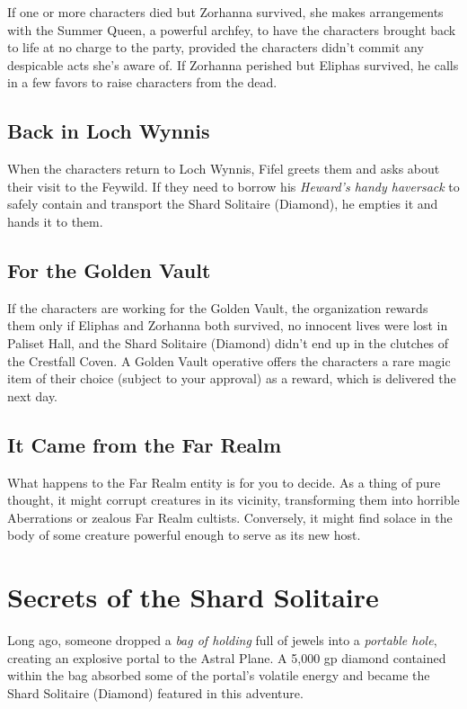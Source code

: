 \documentclass[10pt,a4paper,twoside,bg=print,twocolumn,openany,nodeprecatedcode]{dndbook}
\begin{document}
If one or more characters died but Zorhanna survived, she makes arrangements with the Summer Queen, a powerful archfey, to have the characters brought back to life at no charge to the party, provided the characters didn't commit any despicable acts she's aware of. If Zorhanna perished but Eliphas survived, he calls in a few favors to raise characters from the dead.

\subsection{Back in Loch Wynnis}
When the characters return to Loch Wynnis, Fifel greets them and asks about their visit to the Feywild. If they need to borrow his \textit{Heward's handy haversack} to safely contain and transport the Shard Solitaire (Diamond), he empties it and hands it to them.

\subsection{For the Golden Vault}
If the characters are working for the Golden Vault, the organization rewards them only if Eliphas and Zorhanna both survived, no innocent lives were lost in Paliset Hall, and the Shard Solitaire (Diamond) didn't end up in the clutches of the Crestfall Coven. A Golden Vault operative offers the characters a rare magic item of their choice (subject to your approval) as a reward, which is delivered the next day.

\subsection{It Came from the Far Realm}
What happens to the Far Realm entity is for you to decide. As a thing of pure thought, it might corrupt creatures in its vicinity, transforming them into horrible Aberrations or zealous Far Realm cultists. Conversely, it might find solace in the body of some creature powerful enough to serve as its new host.

\section{Secrets of the Shard Solitaire}
Long ago, someone dropped a \textit{bag of holding} full of jewels into a \textit{portable hole}, creating an explosive portal to the Astral Plane. A 5,000 gp diamond contained within the bag absorbed some of the portal's volatile energy and became the Shard Solitaire (Diamond) featured in this adventure.
\end{document}
